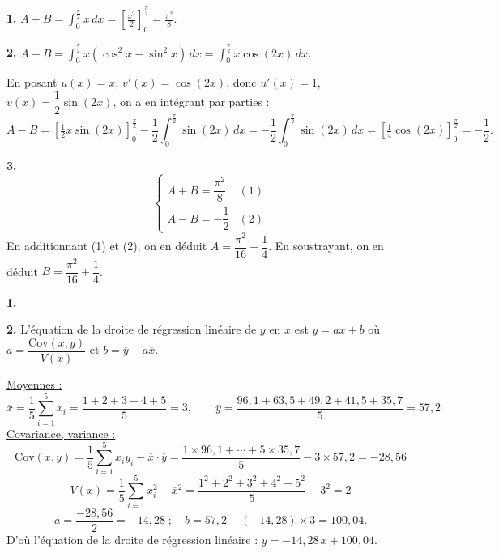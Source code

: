 \documentclass[11pt]{article}
\begin{document}


\textbf{1.} $\displaystyle A + B = \int_0^{\frac{\pi}{2}} x\,dx = \left[\frac{x^2}{2}\right]_0^{\frac{\pi}{2}} = \frac{\pi^2}{8}$.

\textbf{2.} $\displaystyle A - B = \int_0^{\frac{\pi}{2}} x(\cos^2 x - \sin^2 x)\,dx = \int_0^{\frac{\pi}{2}} x\cos(2x)\,dx$.

En posant $u(x) = x$, $v'(x) = \cos(2x)$, donc $u'(x) = 1$, $v(x) = \dfrac{1}{2}\sin(2x)$, on a en intégrant par parties :
\[ A - B = \left[\tfrac{1}{2}x\sin(2x)\right]_0^{\frac{\pi}{2}} - \frac{1}{2}\int_0^{\frac{\pi}{2}}\sin(2x)\,dx = -\frac{1}{2}\int_0^{\frac{\pi}{2}}\sin(2x)\,dx = \left[\tfrac{1}{4}\cos(2x)\right]_0^{\frac{\pi}{2}} = -\frac{1}{2}. \]

\textbf{3.}
\[ \begin{cases} A + B = \dfrac{\pi^2}{8} & (1) \\[1ex] A - B = -\dfrac{1}{2} & (2) \end{cases} \]
En additionnant (1) et (2), on en déduit $A = \dfrac{\pi^2}{16} - \dfrac{1}{4}$. En soustrayant, on en déduit $B = \dfrac{\pi^2}{16} + \dfrac{1}{4}$.


\textbf{1.} \begin{center}
\end{center}

\textbf{2.} L'équation de la droite de régression linéaire de $y$ en $x$ est $y = ax + b$ où $a = \dfrac{\mathrm{Cov}(x, y)}{V(x)}$ et $b = \overline{y} - a\overline{x}$.

\underline{Moyennes :}
\[ \overline{x} = \frac{1}{5}\sum_{i=1}^5 x_i = \frac{1 + 2 + 3 + 4 + 5}{5} = 3, \qquad \overline{y} = \frac{96{,}1 + 63{,}5 + 49{,}2 + 41{,}5 + 35{,}7}{5} = 57{,}2 \]
\underline{Covariance, variance :}
\[ \mathrm{Cov}(x, y) = \frac{1}{5}\sum_{i=1}^5 x_i y_i - \overline{x}\cdot\overline{y} = \frac{1 \times 96{,}1 + \cdots + 5 \times 35{,}7}{5} - 3 \times 57{,}2 = -28{,}56 \]
\[ V(x) = \frac{1}{5}\sum_{i=1}^5 x_i^2 - \overline{x}^2 = \frac{1^2 + 2^2 + 3^2 + 4^2 + 5^2}{5} - 3^2 = 2 \]
\[ a = \frac{-28{,}56}{2} = -14{,}28 \;;\quad b = 57{,}2 - (-14{,}28) \times 3 = 100{,}04. \]
D'où l'équation de la droite de régression linéaire : $y = -14{,}28\,x + 100{,}04$.
\end{document}
